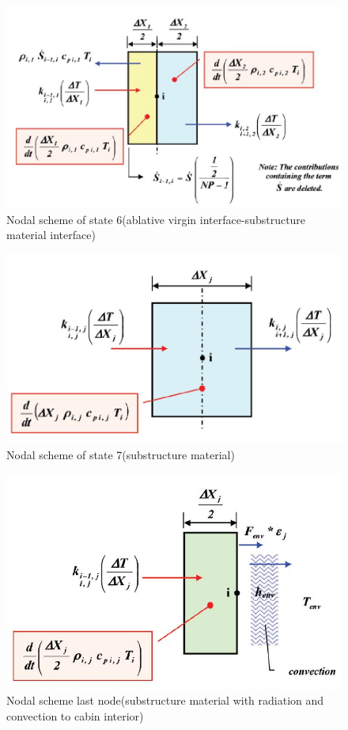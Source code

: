 \documentclass[a4paper, 12pt]{article} %
\begin{document}
\begin{figure}[h!]
  \centering
  \includegraphics[width=0.82 \linewidth]{virgin_sub.jpg}
  \caption{Nodal scheme of state 6(ablative virgin interface-substructure material interface)}
  \label{fig:vs}
\end{figure}
\begin{figure}[h!]
\centering
  \includegraphics[width=0.6 \linewidth]{sub_nodal.jpg}
  \caption{Nodal scheme of state 7(substructure material)}
  \label{fig:sub}
\end{figure}
\begin{figure}[h!]
  \centering
  \includegraphics[width=0.6\linewidth]{node_last.jpg}
  \caption{Nodal scheme last node(substructure material with radiation and convection to cabin interior)}
  \label{fig:node_last}
\newpage
\end{figure}


\newpage
\end{document}
